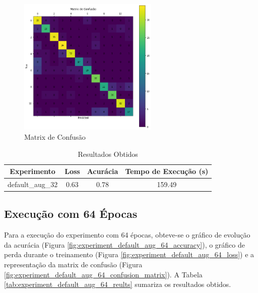 \documentclass[12pt]{article}
\begin{document}
\begin{figure}[!htb]
  \centering
  \includegraphics[width=18em]{experiments/default_aug_32/confusion_matrix.png}
  \caption{Matrix de Confusão}
  \label{fig:experiment_default_aug_32_confusion_matrix}
\end{figure}

\begin{table}[!htb]
  \centering
  \begin{tabular}{|c|c|c|c|}
    \hline
    \textbf{Experimento} & \textbf{Loss} & \textbf{Acurácia} & \textbf{Tempo de Execução (s)} \\ \hline
    default\_aug\_32     & 0.63          & 0.78              & 159.49                         \\ \hline
  \end{tabular}
  \caption{Resultados Obtidos}
  \label{tab:experiment_default_aug_32_reults}
\end{table}

\newpage

\subsection{Execução com 64 Épocas}

Para a execução do experimento com 64 épocas, obteve-se o gráfico de evolução da acurácia (Figura \ref{fig:experiment_default_aug_64_accuracy}), o gráfico de perda durante o treinamento (Figura \ref{fig:experiment_default_aug_64_loss}) e a representação da matrix de confusão (Figura \ref{fig:experiment_default_aug_64_confusion_matrix}). A Tabela \ref{tab:experiment_default_aug_64_reults} sumariza os resultados obtidos.
\end{document}
